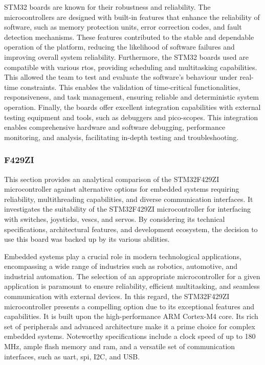 \documentclass [12pt]{article}
\begin{document}
STM32 boards are known for their robustness and reliability. The microcontrollers are designed with built-in features that enhance the reliability of software, such as memory protection units, error correction codes, and fault detection mechanisms. These features contributed to the stable and dependable operation of the platform, reducing the likelihood of software failures and improving overall system reliability. Furthermore, the STM32 boards used are  compatible with various \gls{rtos}, providing scheduling and multitasking capabilities. This allowed the team to test and evaluate the software's behaviour under real-time constraints. This enables the validation of time-critical functionalities, responsiveness, and task management, ensuring reliable and deterministic system operation. Finally, the boards offer excellent integration capabilities with external testing equipment and tools, such as debuggers and pico-scopes. This integration enables comprehensive hardware and software debugging, performance monitoring, and analysis, facilitating in-depth testing and troubleshooting.

\subsubsection{F429ZI}
This section provides an analytical comparison of the STM32F429ZI microcontroller against alternative options for embedded systems requiring reliability, multithreading capabilities, and diverse communication interfaces. It investigates the suitability of the STM32F429ZI microcontroller for interfacing with switches, joysticks, \gls{vesc}s, and servos. By considering its technical specifications, architectural features, and development ecosystem, the decision to use this board was backed up by its various abilities.

Embedded systems play a crucial role in modern technological applications, encompassing a wide range of industries such as robotics, automotive, and industrial automation. The selection of an appropriate microcontroller for a given application is paramount to ensure reliability, efficient multitasking, and seamless communication with external devices. In this regard, the STM32F429ZI microcontroller presents a compelling option due to its exceptional features and capabilities. It is built upon the high-performance ARM Cortex-M4 core. Its rich set of peripherals and advanced architecture make it a prime choice for complex embedded systems. Noteworthy specifications include a clock speed of up to 180 MHz, ample flash memory and \gls{ram}, and a versatile set of communication interfaces, such as \gls{uart}, \gls{spi}, I2C, and USB.
\end{document}
